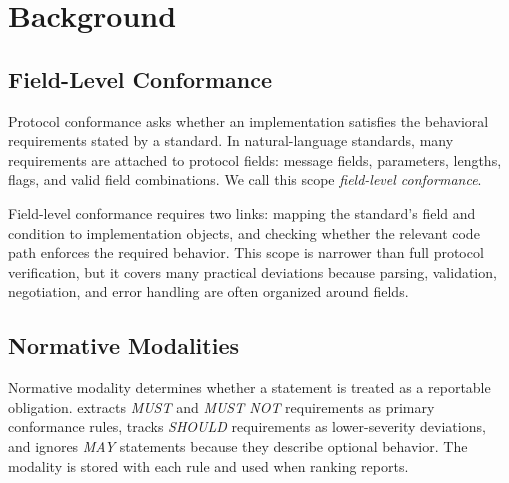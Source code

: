 \section{Background}
\label{sec:background}

\subsection{Field-Level Conformance}

Protocol conformance asks whether an implementation satisfies the behavioral
requirements stated by a standard. In natural-language standards, many
requirements are attached to protocol fields: message fields, parameters,
lengths, flags, and valid field combinations. We call this scope
\emph{field-level conformance}.

Field-level conformance requires two links: mapping the standard's field and
condition to implementation objects, and checking whether the relevant code path
enforces the required behavior. This scope is narrower than full protocol
verification, but it covers many practical deviations because parsing,
validation, negotiation, and error handling are often organized around fields.

\subsection{Normative Modalities}

Normative modality determines whether a statement is treated as a reportable
obligation. \tool{} extracts \emph{MUST} and \emph{MUST NOT} requirements as
primary conformance rules, tracks \emph{SHOULD} requirements as lower-severity
deviations, and ignores \emph{MAY} statements because they describe optional
behavior. The modality is stored with each rule and used when ranking reports.



